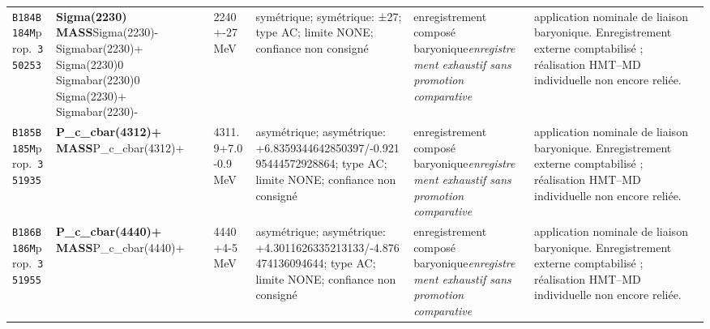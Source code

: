 \begin{landscape}
\begin{longtable}{L{1.85cm}L{4.45cm}L{2.35cm}L{4.05cm}L{3.35cm}L{7.15cm}}
\texttt{B184}\newline \texttt{B184M}\newline prop.\ \texttt{350253} & \textbf{Sigma(2230) MASS}\newline Sigma(2230)- \textbar{}\allowbreak{} Sigmabar(2230)+ \textbar{}\allowbreak{} Sigma(2230)0 \textbar{}\allowbreak{} Sigmabar(2230)0 \textbar{}\allowbreak{} Sigma(2230)+ \textbar{}\allowbreak{} Sigmabar(2230)- & 2240+-27\,MeV & symétrique; symétrique: ±27; type AC; limite NONE; confiance non consigné & enregistrement composé baryonique\newline \emph{enregistrement exhaustif sans promotion comparative} & application nominale de liaison baryonique. Enregistrement externe comptabilisé ; réalisation HMT--MD individuelle non encore reliée. \\
\texttt{B185}\newline \texttt{B185M}\newline prop.\ \texttt{351935} & \textbf{P\_\allowbreak{}c\_\allowbreak{}cbar(4312)+ MASS}\newline P\_\allowbreak{}c\_\allowbreak{}cbar(4312)+ & 4311.9+7.0-0.9\,MeV & asymétrique; asymétrique: +6.8359344642850397/-0.92195444572928864; type AC; limite NONE; confiance non consigné & enregistrement composé baryonique\newline \emph{enregistrement exhaustif sans promotion comparative} & application nominale de liaison baryonique. Enregistrement externe comptabilisé ; réalisation HMT--MD individuelle non encore reliée. \\
\texttt{B186}\newline \texttt{B186M}\newline prop.\ \texttt{351955} & \textbf{P\_\allowbreak{}c\_\allowbreak{}cbar(4440)+ MASS}\newline P\_\allowbreak{}c\_\allowbreak{}cbar(4440)+ & 4440+4-5\,MeV & asymétrique; asymétrique: +4.3011626335213133/-4.876474136094644; type AC; limite NONE; confiance non consigné & enregistrement composé baryonique\newline \emph{enregistrement exhaustif sans promotion comparative} & application nominale de liaison baryonique. Enregistrement externe comptabilisé ; réalisation HMT--MD individuelle non encore reliée. \\

\end{longtable}
\end{landscape}
